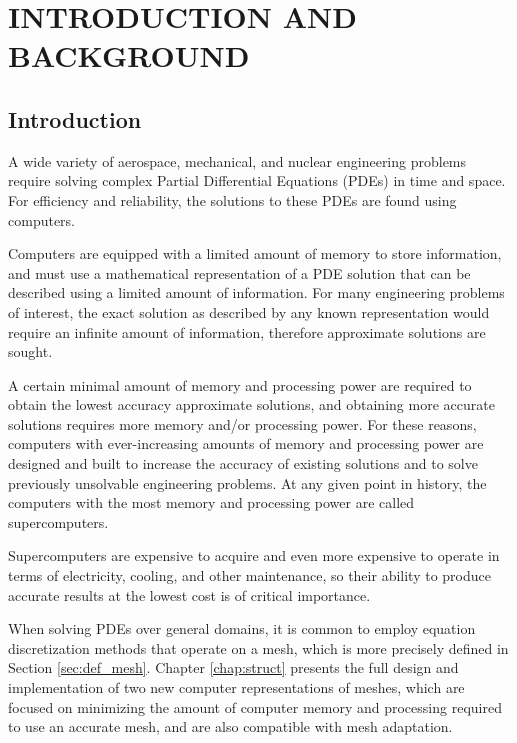 
\chapter{INTRODUCTION AND BACKGROUND}
\label{chap:intro}

\section{Introduction}

A wide variety of aerospace, mechanical, and nuclear engineering
problems require solving complex Partial Differential
Equations (PDEs) in time and space.
For efficiency and reliability, the solutions to these PDEs are
found using computers.

Computers are equipped with a limited amount of memory to
store information, and must use a mathematical representation
of a PDE solution that can be described using
a limited amount of information.
For many engineering problems of interest, the exact solution
as described by any known representation would require an
infinite amount of information, therefore approximate
solutions are sought.

A certain minimal amount of memory and processing power
are required to obtain the lowest accuracy approximate
solutions, and obtaining more accurate solutions requires
more memory and/or processing power.
For these reasons, computers with ever-increasing amounts
of memory and processing power are designed and built to
increase the accuracy of existing solutions and
to solve previously unsolvable engineering problems.
At any given point in history, the computers with the
most memory and processing power are called supercomputers.

Supercomputers are expensive to acquire and even more
expensive to operate in terms of electricity, cooling, and other
maintenance, so their ability to
produce accurate results at the lowest cost
is of critical importance.

When solving PDEs over general domains, it is common to
employ equation discretization methods that operate on a mesh,
which is more precisely defined in Section \ref{sec:def_mesh}.
Chapter \ref{chap:struct} presents the full design
and implementation of two new computer representations
of meshes, which are focused on minimizing the amount
of computer memory and processing required to use
an accurate mesh, and are also compatible with mesh adaptation.

